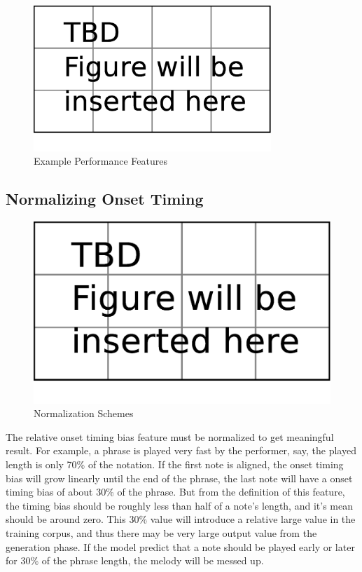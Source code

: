 
   \begin{figure}[tp]
      \begin{center}
         \includegraphics[width=0.8\textwidth]{fig/TBDFigure}
      \end{center}
      \caption{Example Performance Features}
      \label{fig:expPerfFeat}
   \end{figure}
   \subsection{Normalizing Onset Timing}
\begin{figure}[tp]
   \begin{center}
      \includegraphics[width=\textwidth]{fig/TBDFigure}

   \end{center}
   \caption{Normalization Schemes}
   \label{fig:normalization}
\end{figure}
   The relative onset timing bias feature must be normalized to get meaningful result. For example, a phrase is played very fast by the performer, say, the played length is only 70\% of the notation. If the first note is aligned, the onset timing bias will grow linearly until the end of the phrase, the last note will have a onset timing bias of about 30\% of the phrase. But from the definition of this feature, the timing bias should be roughly less than half of  a note's length, and it's mean should be around zero. This 30\% value will introduce a relative large value in the training corpus, and thus there may be very large output value from the generation phase. If the model predict that a note should be played early or later for 30\% of the phrase length, the melody will be messed up. 

